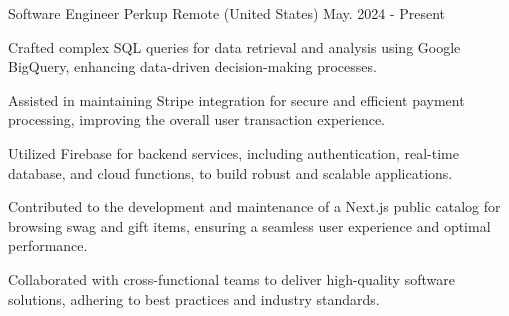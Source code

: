 

\begin{cventries}

\cventry
{Software Engineer} %
{Perkup} %
{Remote (United States)} %
{May. 2024 - Present} %
{
  \begin{cvitems} %
    \item{Crafted complex SQL queries for data retrieval and analysis using Google BigQuery, enhancing data-driven decision-making processes.}
    \item{Assisted in maintaining Stripe integration for secure and efficient payment processing, improving the overall user transaction experience.}
    \item{Utilized Firebase for backend services, including authentication, real-time database, and cloud functions, to build robust and scalable applications.}
    \item{Contributed to the development and maintenance of a Next.js public catalog for browsing swag and gift items, ensuring a seamless user experience and optimal performance.}
    \item{Collaborated with cross-functional teams to deliver high-quality software solutions, adhering to best practices and industry standards.}
  \end{cvitems}
}


\end{cventries}
